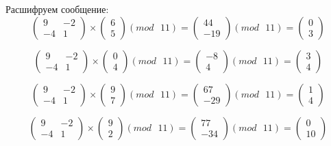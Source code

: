 \documentclass[a5paper, 10pt]{article}
\theoremstyle{definition}
\theoremstyle{plain}
\theoremstyle{remark}
\begin{document}
Расшифруем сообщение:
\begin{equation}
\begin{pmatrix}
 9 & -2\\
 -4 &  1
\end{pmatrix}
 \times
\begin{pmatrix}
 6\\
5
\end{pmatrix}
(mod \text{ }11)
= 
\begin{pmatrix}
 44\\
-19
\end{pmatrix}
(mod \text{ }11)
= \begin{pmatrix}
 0\\
3
\end{pmatrix}
\end{equation}

\begin{equation}
\begin{pmatrix}
 9 & -2\\
 -4 &  1
\end{pmatrix}
 \times
\begin{pmatrix}
 0\\
4
\end{pmatrix}
(mod \text{ }11)
= 
\begin{pmatrix}
 -8\\
4
\end{pmatrix}
(mod \text{ }11)
= \begin{pmatrix}
3\\
4
\end{pmatrix}
\end{equation}

\begin{equation}
\begin{pmatrix}
 9 & -2\\
 -4 &  1
\end{pmatrix}
 \times
\begin{pmatrix}
 9\\
7
\end{pmatrix}
(mod \text{ }11)
= 
\begin{pmatrix}
 67\\
-29
\end{pmatrix}
(mod \text{ }11)
= \begin{pmatrix}
1\\
4
\end{pmatrix}
\end{equation}

\begin{equation}
\begin{pmatrix}
 9 & -2\\
 -4 &  1
\end{pmatrix}
 \times
\begin{pmatrix}
9\\
2
\end{pmatrix}
(mod \text{ }11)
= 
\begin{pmatrix}
 77\\
-34
\end{pmatrix}
(mod \text{ }11)
= \begin{pmatrix}
0\\
10
\end{pmatrix}
\end{equation}
\end{document}
